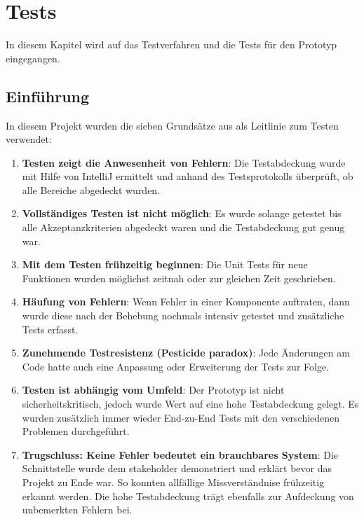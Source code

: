 %
%

\chapter{Tests \resultAssignment{[R6]}}\label{chap.tests} 
In diesem Kapitel wird auf das Testverfahren und die Tests für den Prototyp eingegangen.

\section{Einführung}
In diesem Projekt wurden die sieben Grundsätze aus \cite{test_soft_book} als Leitlinie zum Testen verwendet:
\begin{enumerate}
\item \textbf{Testen zeigt die Anwesenheit von Fehlern}: Die Testabdeckung wurde mit Hilfe von IntelliJ ermittelt und anhand des Testsprotokolls überprüft, ob alle Bereiche abgedeckt wurden.
\item \textbf{Vollständiges Testen ist nicht möglich}: Es wurde solange getestet bis alle Akzeptanzkriterien abgedeckt waren und die Testabdeckung gut genug war.
\item \textbf{Mit dem Testen frühzeitig beginnen}: Die Unit Tests für neue Funktionen wurden möglichst zeitnah oder zur gleichen Zeit geschrieben.
\item \textbf{Häufung von Fehlern}: Wenn Fehler in einer Komponente auftraten, dann wurde diese nach der Behebung nochmals intensiv getestet und zusätzliche Tests erfasst.
\item \textbf{Zunehmende Testresistenz (Pesticide paradox)}: Jede Änderungen am Code hatte auch eine Anpassung oder Erweiterung der Tests zur Folge.
\item \textbf{Testen ist abhängig vom Umfeld}: Der Prototyp ist nicht sicherheitskritisch, jedoch wurde Wert auf eine hohe Testabdeckung gelegt. Es wurden zusätzlich immer wieder 
	End-zu-End Tests mit den verschiedenen Problemen durchgeführt.
\item \textbf{Trugschluss: Keine Fehler bedeutet ein brauchbares System}: Die Schnittstelle wurde dem \gls{stakeholder} demonstriert und erklärt bevor das Projekt zu Ende war. So 
	konnten allfällige Missverständnise frühzeitig erkannt werden. Die hohe Testabdeckung trägt ebenfalls zur Aufdeckung von unbemerkten Fehlern bei.
\end{enumerate}

